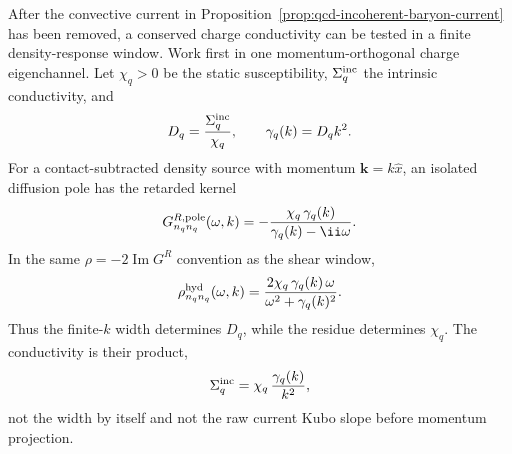 \begin{controlledapproximation}
\label{ca:qcd-finite-charge-diffusion-spectral-window}
After the convective current in
Proposition~\ref{prop:qcd-incoherent-baryon-current} has been removed, a
conserved charge conductivity can be tested in a finite density-response
window.  Work first in one momentum-orthogonal charge eigenchannel.  Let
\(\chi_q>0\) be the static susceptibility, \(\Sigma_q^{\rm inc}\) the
intrinsic conductivity, and
\[
  D_q=\frac{\Sigma_q^{\rm inc}}{\chi_q},
  \qquad
  \gamma_q(k)=D_q k^2 .
\]
For a contact-subtracted density source with momentum
\(\mathbf k=k\hat x\), an isolated diffusion pole has the retarded kernel
\begin{equation}
  G_{n_qn_q}^{R,{\rm pole}}(\omega,k)
  =
  -\frac{\chi_q\,\gamma_q(k)}{\gamma_q(k)-\ii\omega}.
  \label{eq:qcd-charge-diffusion-retarded-pole}
\end{equation}
In the same \(\rho=-2\operatorname{Im}G^R\) convention as the shear window,
\begin{equation}
  \rho^{\rm hyd}_{n_qn_q}(\omega,k)
  =
  \frac{2\chi_q\,\gamma_q(k)\,\omega}
       {\omega^2+\gamma_q(k)^2}.
  \label{eq:qcd-charge-diffusion-spectral-peak}
\end{equation}
Thus the finite-\(k\) width determines \(D_q\), while the residue determines
\(\chi_q\).  The conductivity is their product,
\[
  \Sigma_q^{\rm inc}=\chi_q\,\frac{\gamma_q(k)}{k^2},
\]
not the width by itself and not the raw current Kubo slope before momentum
projection.


\end{controlledapproximation}
